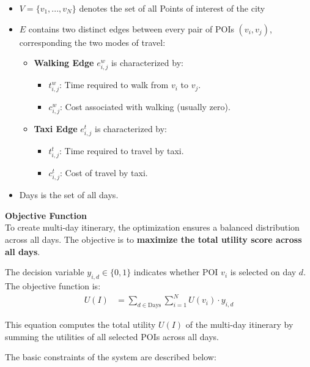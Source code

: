 \begin{itemize}
    \item \( V = \{v_1, ..., v_N\} \) denotes the set of all Points of interest of the city
    \item \( E \) contains two distinct edges between every pair of POIs \( (v_i, v_j) \), corresponding the two modes of travel:
    \begin{itemize}
        \item \textbf{Walking Edge} \( e^{w}_{i,j} \) is characterized by:
        \begin{itemize}
            \item \( t^{w}_{i,j} \): Time required to walk from \( v_i \) to \( v_j \).
            \item \( c^{w}_{i,j} \): Cost associated with walking (usually zero).
        \end{itemize}
        \item \textbf{Taxi Edge} \( e^{t}_{i,j} \) is characterized by:
        \begin{itemize}
            \item \( t^{t}_{i,j} \): Time required to travel by taxi.
            \item \( c^{t}_{i,j} \): Cost of travel by taxi.
        \end{itemize}
    \end{itemize}
    \item Days is the set of all days.
\end{itemize}

\noindent \textbf{Objective Function}\\
To create multi-day itinerary, the optimization ensures a balanced distribution across all days. The objective is to \textbf{maximize the total utility score across all days}.

The decision variable \( y_{i,d} \in \{0,1\} \) indicates whether POI \( v_i \) is selected on day \( d \). The objective function is:
\begin{align}
U(I) &= \sum_{d \in \text{Days}} \sum_{i = 1}^{N} U(v_i) \cdot y_{i,d} \label{eq:multi_day_binary}
\end{align}

This equation computes the total utility $U(I)$ of the multi-day itinerary by summing the utilities of all selected POIs across all days.

The basic constraints of the system are described below:


